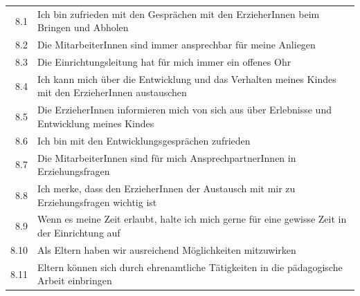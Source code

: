 \documentclass[12pt,a4paper]{article}
\begin{document}
\begin{appendix}
\begin{table}[h]
\begin{tabularx}{\textwidth}{rX}
           \\\hline  
8.1& Ich bin zufrieden mit den Gesprächen mit den ErzieherInnen
      beim Bringen und Abholen                                                                                                                                                                                                              \\      
8.2& Die MitarbeiterInnen sind immer ansprechbar für meine   
      Anliegen                                                                                                                                                \\
8.3& Die Einrichtungsleitung hat für mich immer ein offenes Ohr             
 \\
8.4& Ich kann mich über die Entwicklung und das Verhalten
      meines Kindes mit den ErzieherInnen austauschen                                                                                             \\
8.5 &Die ErzieherInnen informieren mich von sich aus über
      Erlebnisse und Entwicklung meines Kindes                                                                                                                                         \\
8.6& Ich bin mit den Entwicklungsgesprächen zufrieden                                          \\
8.7& Die MitarbeiterInnen sind für mich AnsprechpartnerInnen in             
      Erziehungsfragen                                                                                   \\
8.8& Ich merke, dass den ErzieherInnen der Austausch mit mir zu
      Erziehungsfragen wichtig ist                                                                 \\
8.9& Wenn es meine Zeit erlaubt, halte ich mich gerne für eine
      gewisse Zeit in der Einrichtung auf                                                                                                                  \\
8.10& Als Eltern haben wir ausreichend Möglichkeiten mitzuwirken                                                                                                                                                                                                                                                     \\
8.11& Eltern können sich durch ehrenamtliche Tätigkeiten in die
        pädagogische Arbeit einbringen                                                                                                                                                                                             \\ 

\end{tabularx}
\end{table}
\end{appendix}
\end{document}
